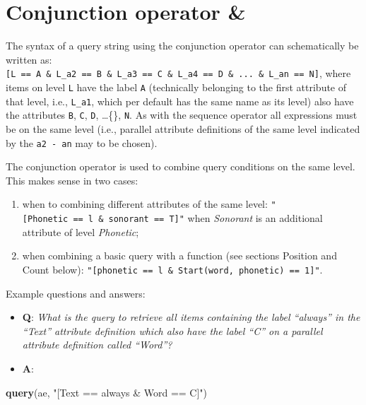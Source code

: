 \documentclass[]{book}
\newenvironment{Shaded}{\begin{snugshade}}{\end{snugshade}}
\newcommand{\KeywordTok}[1]{\textcolor[rgb]{0.13,0.29,0.53}{\textbf{#1}}}
\newcommand{\NormalTok}[1]{#1}
\newcommand{\StringTok}[1]{\textcolor[rgb]{0.31,0.60,0.02}{#1}}
\providecommand{\tightlist}{%
  \setlength{\itemsep}{0pt}\setlength{\parskip}{0pt}}
\begin{document}
\hypertarget{conjunction-operator}{%
\section{Conjunction operator \&}\label{conjunction-operator}}

The syntax of a query string using the conjunction operator can schematically be written as: \texttt{{[}L\ ==\ A\ \&\ L\_a2\ ==\ B\ \&\ L\_a3\ ==\ C\ \&\ L\_a4\ ==\ D\ \&\ ...\ \&\ L\_an\ ==\ N{]}}, where items on level \texttt{L} have the label \texttt{A} (technically belonging to the first attribute of that level, i.e., \texttt{L\_a1}, which per default has the same name as its level) also have the attributes \texttt{B}, \texttt{C}, \texttt{D}, \ldots\{\}, \texttt{N}. As with the sequence operator all expressions must be on the same level (i.e., parallel attribute definitions of the same level indicated by the \texttt{a2\ -\ an} may to be chosen).

The conjunction operator is used to combine query conditions on the same level. This makes sense in two cases:

\begin{enumerate}
\def\labelenumi{\arabic{enumi}.}
\tightlist
\item
  when to combining different attributes of the same level: \texttt{"{[}Phonetic\ ==\ l\ \&\ sonorant\ ==\ T{]}"} when \emph{Sonorant} is an additional attribute of level \emph{Phonetic};
\item
  when combining a basic query with a function (see sections Position and Count below): \texttt{"{[}phonetic\ ==\ l\ \&\ Start(word,\ phonetic)\ ==\ 1{]}"}.
\end{enumerate}

Example questions and answers:

\begin{itemize}
\tightlist
\item
  \textbf{Q}: \emph{What is the query to retrieve all items containing the label ``always'' in the ``Text'' attribute definition which also have the label ``C'' on a parallel attribute definition called ``Word''?}
\item
  \textbf{A}:
\end{itemize}

\begin{Shaded}
\begin{Highlighting}[]
\KeywordTok{query}\NormalTok{(ae, }\StringTok{"[Text == always & Word == C]"}\NormalTok{)}
\end{Highlighting}
\end{Shaded}
\end{document}
